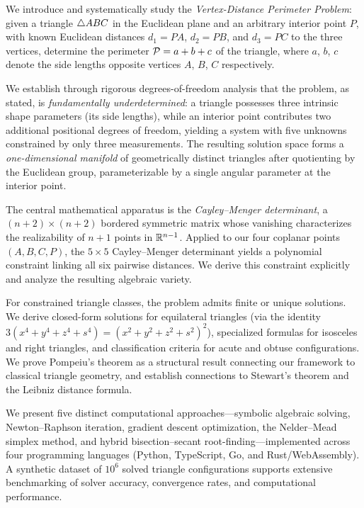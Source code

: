 
We introduce and systematically study the \emph{Vertex-Distance Perimeter Problem}: given a triangle $\triangle ABC$ in the Euclidean plane and an arbitrary interior point $P$, with known Euclidean distances $d_1 = PA$, $d_2 = PB$, and $d_3 = PC$ to the three vertices, determine the perimeter $\mathcal{P} = a + b + c$ of the triangle, where $a$, $b$, $c$ denote the side lengths opposite vertices $A$, $B$, $C$ respectively.

We establish through rigorous degrees-of-freedom analysis that the problem, as stated, is \emph{fundamentally underdetermined}: a triangle possesses three intrinsic shape parameters (its side lengths), while an interior point contributes two additional positional degrees of freedom, yielding a system with five unknowns constrained by only three measurements. The resulting solution space forms a \emph{one-dimensional manifold} of geometrically distinct triangles after quotienting by the Euclidean group, parameterizable by a single angular parameter at the interior point.

The central mathematical apparatus is the \emph{Cayley--Menger determinant}, a $(n+2) \times (n+2)$ bordered symmetric matrix whose vanishing characterizes the realizability of $n+1$ points in $\mathbb{R}^{n-1}$. Applied to our four coplanar points $(A, B, C, P)$, the $5 \times 5$ Cayley--Menger determinant yields a polynomial constraint linking all six pairwise distances. We derive this constraint explicitly and analyze the resulting algebraic variety.

For constrained triangle classes, the problem admits finite or unique solutions. We derive closed-form solutions for equilateral triangles (via the identity $3(x^4 + y^4 + z^4 + s^4) = (x^2 + y^2 + z^2 + s^2)^2$), specialized formulas for isosceles and right triangles, and classification criteria for acute and obtuse configurations. We prove Pompeiu's theorem as a structural result connecting our framework to classical triangle geometry, and establish connections to Stewart's theorem and the Leibniz distance formula.

We present five distinct computational approaches---symbolic algebraic solving, Newton--Raphson iteration, gradient descent optimization, the Nelder--Mead simplex method, and hybrid bisection--secant root-finding---implemented across four programming languages (Python, TypeScript, Go, and Rust/WebAssembly). A synthetic dataset of $10^6$ solved triangle configurations supports extensive benchmarking of solver accuracy, convergence rates, and computational performance.

